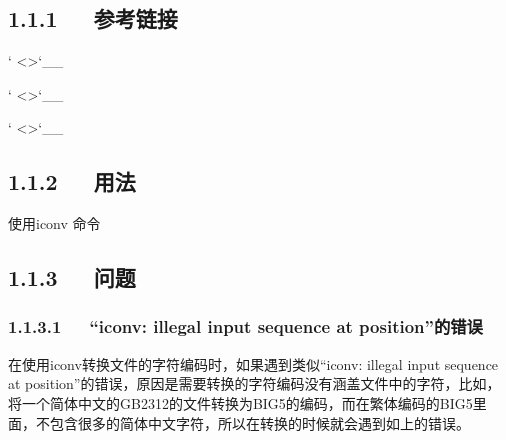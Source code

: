 \documentclass[letterpaper,12pt,english]{sphinxmanual}
\begin{document}
\subsection{1.1.1   参考链接}
\label{\detokenize{001software/001install/tools:id1}}
{}` \textless{}\textgreater{}{}`\_\_


{}` \textless{}\textgreater{}{}`\_\_

{}` \textless{}\textgreater{}{}`\_\_


\subsection{1.1.2   用法}
\label{\detokenize{001software/001install/tools:id2}}
使用iconv 命令

\begin{sphinxVerbatim}[commandchars=\\\{\}]
       

\end{sphinxVerbatim}


\subsection{1.1.3   问题}
\label{\detokenize{001software/001install/tools:id3}}

\subsubsection{1.1.3.1   “iconv: illegal input sequence at position”的错误}
\label{\detokenize{001software/001install/tools:iconv-illegal-input-sequence-at-position}}

在使用iconv转换文件的字符编码时，如果遇到类似“iconv: illegal input sequence at position”的错误，原因是需要转换的字符编码没有涵盖文件中的字符，比如，将一个简体中文的GB2312的文件转换为BIG5的编码，而在繁体编码的BIG5里面，不包含很多的简体中文字符，所以在转换的时候就会遇到如上的错误。
\end{document}
